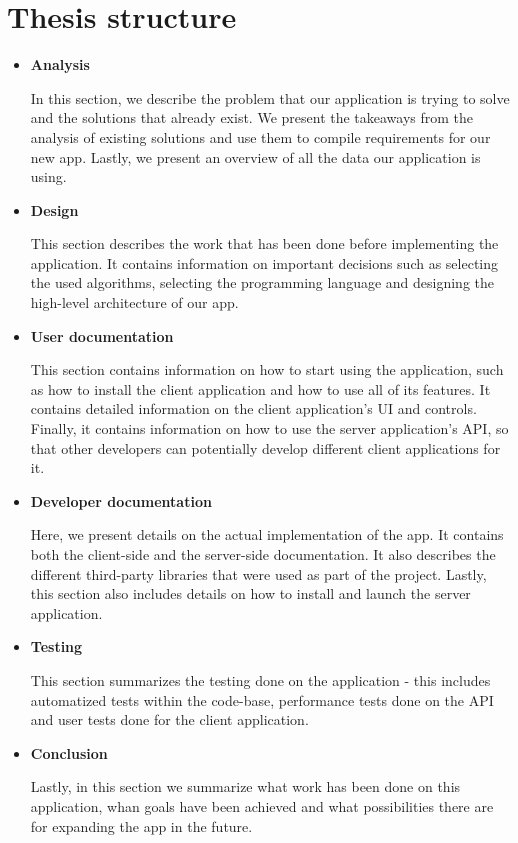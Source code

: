 \section{Thesis structure}
\begin{itemize}
    \item \textbf{Analysis}

    In this section, we describe the problem that our application is trying to solve and the solutions that already exist. We present the takeaways from the analysis of existing solutions and use them to compile requirements for our new app. Lastly, we present an overview of all the data our application is using.

    \item \textbf{Design}

    This section describes the work that has been done before implementing the application. It contains information on important decisions such as selecting the used algorithms, selecting the programming language and designing the high-level architecture of our app.

    \item \textbf{User documentation}

    This section contains information on how to start using the application, such as how to install the client application and how to use all of its features. It contains detailed information on the client application's UI and controls. Finally, it contains information on how to use the server application's API, so that other developers can potentially develop different client applications for it.

    \item \textbf{Developer documentation}

    Here, we present details on the actual implementation of the app. It contains both the client-side and the server-side documentation. It also describes the different third-party libraries that were used as part of the project. Lastly, this section also includes details on how to install and launch the server application.

    \item \textbf{Testing}

    This section summarizes the testing done on the application - this includes automatized tests within the code-base, performance tests done on the API and user tests done for the client application.

    \item \textbf{Conclusion}

    Lastly, in this section we summarize what work has been done on this application, whan goals have been achieved and what possibilities there are for expanding the app in the future.
\end{itemize}
\xxx{}

